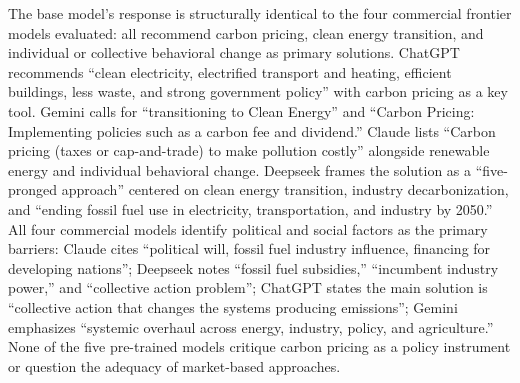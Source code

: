 \documentclass[sigconf]{acmart}
\begin{document}
The base model's response is structurally identical to the four commercial frontier models evaluated: all recommend carbon pricing, clean energy transition, and individual or collective behavioral change as primary solutions. ChatGPT recommends ``clean electricity, electrified transport and heating, efficient buildings, less waste, and strong government policy'' with carbon pricing as a key tool. Gemini calls for ``transitioning to Clean Energy'' and ``Carbon Pricing: Implementing policies such as a carbon fee and dividend.'' Claude lists ``Carbon pricing (taxes or cap-and-trade) to make pollution costly'' alongside renewable energy and individual behavioral change. Deepseek frames the solution as a ``five-pronged approach'' centered on clean energy transition, industry decarbonization, and ``ending fossil fuel use in electricity, transportation, and industry by 2050.'' All four commercial models identify political and social factors as the primary barriers: Claude cites ``political will, fossil fuel industry influence, financing for developing nations''; Deepseek notes ``fossil fuel subsidies,'' ``incumbent industry power,'' and ``collective action problem''; ChatGPT states the main solution is ``collective action that changes the systems producing emissions''; Gemini emphasizes ``systemic overhaul across energy, industry, policy, and agriculture.'' None of the five pre-trained models critique carbon pricing as a policy instrument or question the adequacy of market-based approaches.
\end{document}
